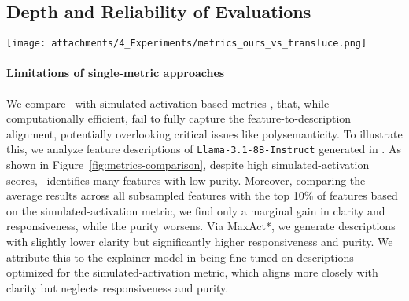 \subsection{Depth and Reliability of Evaluations}\label{sec:Results}


\begin{figure*}[t!]
    \centering
    \texttt{[image: attachments/4\_Experiments/metrics\_ours\_vs\_transluce.png]}
    \caption{Distribution of metrics in \ours\ framework and a simulation-based metric on a uniformly subsampled set of features and the top 10\% of subsampled features, selected based on the simulated activation metric generated in \cite{choi2024automatic} (right), and comparison to the proposed descriptions for these features, generated in this work (left).}
    \label{fig:metrics-comparison}
\end{figure*}


\paragraph{Limitations of single-metric approaches}
We compare \ours\ with simulated-activation-based metrics \cite{bills2023language, templeton2024scaling, choi2024automatic}, that, while computationally efficient, 
fail to fully capture the feature-to-description alignment, potentially overlooking critical issues like polysemanticity.
To illustrate this, we analyze feature descriptions of \texttt{Llama-3.1-8B-Instruct} generated in \cite{choi2024automatic}. As shown in Figure~\ref{fig:metrics-comparison}, despite high simulated-activation scores, \ours\ identifies many features with low purity. Moreover, comparing the average results across all subsampled features with the top 10\% of features based on the simulated-activation metric, we find only a marginal gain in clarity and responsiveness, while the purity worsens.
Via MaxAct*, we generate descriptions with slightly lower clarity but significantly higher responsiveness and purity. We attribute this to the explainer model in \cite{choi2024automatic} being fine-tuned on descriptions optimized for the simulated-activation metric, which aligns more closely with clarity but neglects responsiveness and purity.

